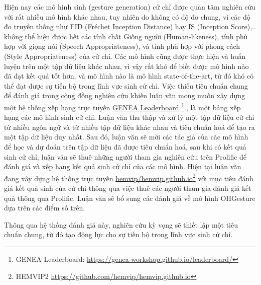 Hiện nay các mô hình sinh (gesture generation) cử chỉ được quan tâm nghiên cứu với rất nhiều mô hình khác nhau, tuy nhiên do không có độ đo chung, vì các độ đo truyền thống như FID (Fréchet Inception Distance) hay IS (Inception Score),.. không thể hiện được hết các tính chất Giống người (Human-likeness), tính phù hợp với giọng nói (Speech Appropriateness), và tính phù hợp với phong cách (Style Appropriateness) của cử chỉ. Các mô hình cũng được thực hiện và huấn luyện trên một tập dữ liệu khác nhau, vì vậy rất khó để biết được mô hình nào đã đạt kết quả tốt hơn, và mô hình nào là mô hình state-of-the-art, từ đó khó có thể đạt được sự tiến bộ trong lĩnh vực sinh cử chỉ. Việc thiếu tiêu chuẩn chung để đánh giá trong cộng đồng nghiên cứu khiến luận văn mong muốn xây dựng một hệ thống xếp hạng trực tuyến \cite{nagy2024towards} \hyperlink{https://genea-workshop.github.io/leaderboard/}{GENEA Leaderboard} \footnote{GENEA Leaderboard: \url{https://genea-workshop.github.io/leaderboard/}}., là một bảng xếp hạng các mô hình sinh cử chỉ. Luận văn thu thập và xử lý một tập dữ liệu cử chỉ từ nhiều ngôn ngữ và từ nhiều tập dữ liệu khác nhau và tiêu chuẩn hoá để tạo ra một tập dữ liệu duy nhất.  Sau đó, luận văn sẽ mời các tác giả của các mô hình để học và dự đoán trên tập dữ liệu đã được tiêu chuẩn hoá, sau khi có kết quả sinh cử chỉ, luận văn sẽ thuê những người tham gia nghiên cứu trên Prolific để đánh giá và xếp hạng kết quả sinh cử chỉ của các mô hình. Hiện tại luận văn đang xây dựng hệ thống trực tuyến \hyperlink{https://github.com/hemvip/hemvip.github.io}{hemvip/hemvip.github.io}\footnote{HEMVIP2 \url{https://github.com/hemvip/hemvip.github.io}} với mục tiêu đánh giá kết quả sinh của cử chỉ thông qua việc thuê các người tham gia đánh giá kết quả thông qua Prolific. Luận văn sẽ bổ sung các đánh giá về mô hình OHGesture dựa trên các điểm số trên.


Thông qua hệ thống đánh giá này, nghiên cứu kỳ vọng sẽ thiết lập một tiêu chuẩn chung, từ đó tạo động lực cho sự tiến bộ trong lĩnh vực sinh cử chỉ.




